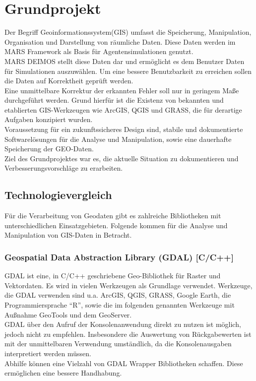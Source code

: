 \documentclass[10pt,conference,compsocconf]{IEEEtran}
\begin{document}
\section{Grundprojekt}
Der Begriff Geoinformationssystem(GIS) umfasst die Speicherung, Manipulation, Organisation und Darstellung von räumliche Daten. Diese Daten werden im MARS Framework als Basis für Agentensimulationen genutzt.\\
MARS DEIMOS stellt diese Daten dar und ermöglicht es dem Benutzer Daten für Simulationen auszuwählen. Um eine bessere Benutzbarkeit zu erreichen sollen die Daten auf Korrektheit geprüft werden.\\
Eine unmittelbare Korrektur der erkannten Fehler soll nur in geringem Maße durchgeführt werden. Grund hierfür ist die Existenz von bekannten und etablierten GIS-Werkzeugen wie ArcGIS, QGIS und GRASS, die für derartige Aufgaben konzipiert wurden.\\
Voraussetzung für ein zukunftssicheres Design sind, stabile und dokumentierte Softwarelösungen für die Analyse und Manipulation, sowie eine dauerhafte Speicherung der GEO-Daten.\\
Ziel des Grundprojektes war es, die aktuelle Situation zu dokumentieren und Verbesserungsvorschläge zu erarbeiten.\\


\subsection{Technologievergleich}
Für die Verarbeitung von Geodaten gibt es zahlreiche Bibliotheken mit unterschiedlichen Einsatzgebieten. Folgende kommen für die Analyse und Manipulation von GIS-Daten in Betracht.\\

\subsubsection{Geospatial Data Abstraction Library (GDAL) [C/C++]}
GDAL ist eine, in C/C++ geschriebene Geo-Bibliothek für Raster und Vektordaten. Es wird in vielen Werkzeugen als Grundlage verwendet. Werkzeuge, die GDAL verwenden sind u.a. ArcGIS, QGIS, GRASS, Google Earth, die Programmiersprache \enquote{R}, sowie die im folgenden genannten Werkzeuge mit Außnahme GeoTools und dem GeoServer.\\
GDAL über den Aufruf der Konsolenanwendung direkt zu nutzen ist möglich, jedoch nicht zu empfehlen. Insbesondere die Auswertung von Rückgabewerten ist mit der unmittelbaren Verwendung umständlich, da die Konsolenausgaben interpretiert werden müssen.\\
Abhilfe können eine Vielzahl von GDAL Wrapper Bibliotheken schaffen. Diese ermöglichen eine bessere Handhabung.\\
\end{document}
